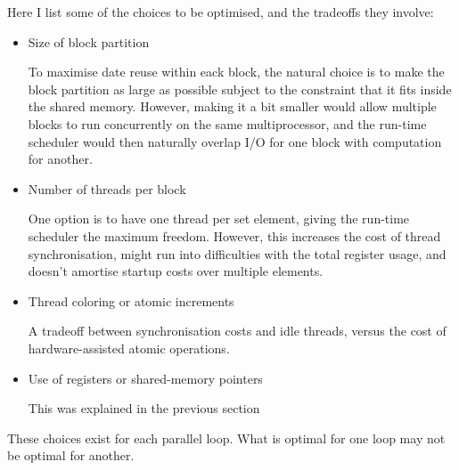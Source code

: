 \documentclass[12pt]{article}
\begin{document}
Here I list some of the choices to be optimised, and the tradeoffs
they involve:
\begin{itemize}
\item
Size of block partition

To maximise date reuse within eack block, the natural choice is 
to make the block partition as large as possible subject to the
constraint that it fits inside the shared memory.  However, 
making it a bit smaller would allow multiple blocks to run 
concurrently on the same multiprocessor, and the run-time 
scheduler would then naturally overlap I/O for one block
with computation for another.

\item
Number of threads per block

One option is to have one thread per set element, giving the 
run-time scheduler the maximum freedom.  However, this increases
the cost of thread synchronisation, might run into difficulties 
with the total register usage, and doesn't amortise startup 
costs over multiple elements.

\item
Thread coloring or atomic increments

A tradeoff between synchronisation costs and idle threads, 
versus the cost of hardware-assisted atomic operations.

\item
Use of registers or shared-memory pointers

This was explained in the previous section
\end{itemize}


These choices exist for each parallel loop.  What is optimal 
for one loop may not be optimal for another.
\end{document}
